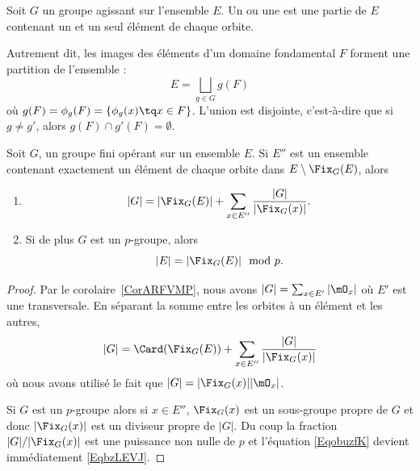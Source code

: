 \begin{definition}  \label{DefcSuYxz}
	Soit \( G\) un groupe agissant sur l'ensemble \( E\). Un  ou une  est une partie de \( E\) contenant un et un seul élément de chaque orbite.
\end{definition}
Autrement dit, les images des éléments d'un domaine fondamental \( F\) forment une partition de l'ensemble :
\begin{equation}
	E=\bigsqcup_{g\in G}g(F)
\end{equation}
où  \( g(F) = \phi_g(F) = \{ \phi_g(x) \tq x \in F\} \). L'union est disjointe, c'est-à-dire que si \( g\neq g'\), alors \( g(F)\cap g'(F)=\emptyset\).


\begin{proposition}       \label{PropUyLPdp}
	Soit \( G\), un groupe fini opérant sur un ensemble \( E\). Si \( E''\) est un ensemble contenant exactement un élément de chaque orbite dans \( E\setminus\Fix_G(E)\), alors
	\begin{enumerate}
		\item
		      \begin{equation}        \label{EqobuzfK}
			      | G |=| \Fix_G(E) |+\sum_{x\in E''}\frac{ | G | }{ | \Fix_G(x) | }.
		      \end{equation}
		\item		\label{ITEMooDZMKooAuYNte}
		      Si de plus \( G\) est un \( p\)-groupe, alors
		      \begin{equation}    \label{EqbzLEVJ}
			      | E |=| \Fix_G(E) |\mod p.
		      \end{equation}
	\end{enumerate}
\end{proposition}

\begin{proof}
	Par le corolaire~\ref{CorARFVMP}, nous avons \( | G |=\sum_{x\in E'}| \mO_x |\) où \( E'\) est une transversale.  En séparant la somme entre les orbites à un élément et les autres,
	\begin{equation}    \label{EqeggkBs}
		| G |=\Card(\Fix_G(E))+\sum_{x\in E''}\frac{ | G | }{ | \Fix_G(x) | }
	\end{equation}  \label{EqDgYbhm}
	où nous avons utilisé le fait que \( | G |=| \Fix_G(x) | |\mO_x |\).

	Si \( G\) est un \( p\)-groupe alors si \( x\in E''\), \( \Fix_G(x)\) est un sous-groupe propre de \( G\) et donc \( | \Fix_G(x) |\) est un diviseur propre de \( | G |\). Du coup la fraction \( | G |/|\Fix_G(x)|\) est une puissance non nulle de \( p\) et l'équation \eqref{EqobuzfK} devient immédiatement \eqref{EqbzLEVJ}.
\end{proof}

